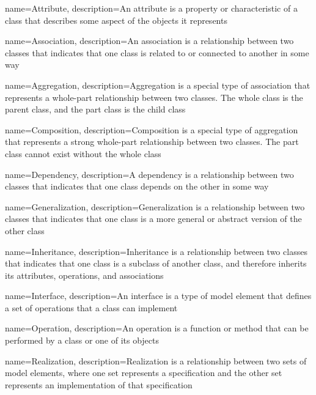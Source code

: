 %
%


{
name={Attribute},
description={An attribute is a property or characteristic of a class that describes some aspect of the objects it represents}
}

{
name={Association},
description={An association is a relationship between two classes that indicates that one class is related to or connected to another in some way}
}

{
name={Aggregation},
description={Aggregation is a special type of association that represents a whole-part relationship between two classes. The whole class is the parent class, and the part class is the child class}
}

{
name={Composition},
description={Composition is a special type of aggregation that represents a strong whole-part relationship between two classes. The part class cannot exist without the whole class}
}

{
name={Dependency},
description={A dependency is a relationship between two classes that indicates that one class depends on the other in some way}
}

{
name={Generalization},
description={Generalization is a relationship between two classes that indicates that one class is a more general or abstract version of the other class}
}

{
name={Inheritance},
description={Inheritance is a relationship between two classes that indicates that one class is a subclass of another class, and therefore inherits its attributes, operations, and associations}
}

{
name={Interface},
description={An interface is a type of model element that defines a set of operations that a class can implement}
}

{
name={Operation},
description={An operation is a function or method that can be performed by a class or one of its objects}
}

{
name={Realization},
description={Realization is a relationship between two sets of model elements, where one set represents a specification and the other set represents an implementation of that specification}
}

